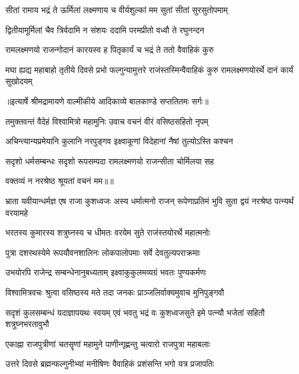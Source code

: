 \twolineshloka
{सीतां रामाय भद्रं ते ऊर्मिलां लक्ष्मणाय च}
{वीर्यशुल्कां मम सुतां सीतां सुरसुतोपमाम्} %

\twolineshloka
{द्वितीयामूर्मिलां चैव त्रिर्वदामि न संशयः}
{ददामि परमप्रीतो वध्वौ ते रघुनन्दन} %

\twolineshloka
{रामलक्ष्मणयो राजन्गोदानं कारयस्व ह}
{पितृकार्यं च भद्रं ते ततो वैवाहिकं कुरु} %

\threelineshloka
{मघा ह्यद्य महाबाहो तृतीये दिवसे प्रभो}
{फल्गुन्यामुत्तरे राजंस्तस्मिन्वैवाहिकं कुरु}
{रामलक्ष्मणयोरर्थे दानं कार्यं सुखोदयम्} %


{॥इत्यार्षे श्रीमद्रामायणे वाल्मीकीये आदिकाव्ये बालकाण्डे सप्ततितमः सर्गः॥}


\twolineshloka
{तमुक्तवन्तं वैदेहं विश्वामित्रो महामुनिः}
{उवाच वचनं वीरं वसिष्ठसहितो नृपम्} %

\twolineshloka
{अचिन्त्यान्यप्रमेयानि कुलानि नरपुङ्गव}
{इक्ष्वाकूणां विदेहानां नैषां तुल्योऽस्ति कश्चन} %

\twolineshloka
{सदृशो धर्मसम्बन्धः सदृशो रूपसम्पदा}
{रामलक्ष्मणयो राजन्सीता चोर्मिलया सह} %

{वक्तव्यं न नरश्रेष्ठ श्रूयतां वचनं मम॥॥} %

\addtocounter{shlokacount}{1}

\threelineshloka
{भ्राता यवीयान्धर्मज्ञ एष राजा कुशध्वजः}
{अस्य धर्मात्मनो राजन् रूपेणाप्रतिमं भुवि}
{सुता द्वयं नरश्रेष्ठ पत्न्यर्थं वरयामहे} %

\twolineshloka
{भरतस्य कुमारस्य शत्रुघ्नस्य च धीमतः}
{वरयेम सुते राजंस्तयोरर्थे महात्मनोः} %

\twolineshloka
{पुत्रा दशरथस्येमे रूपयौवनशालिनः}
{लोकपालोपमाः सर्वे देवतुल्यपराक्रमाः} %

\twolineshloka
{उभयोरपि राजेन्द्र सम्बन्धेनानुबध्यताम्}
{इक्ष्वाकुकुलमव्यग्रं भवतः पुण्यकर्मणः} %

\twolineshloka
{विश्वामित्रवचः श्रुत्वा वसिष्ठस्य मते तदा}
{जनकः प्राञ्जलिर्वाक्यमुवाच मुनिपुङ्गवौ} %

\threelineshloka
{सदृशं कुलसम्बन्धं यदाज्ञापयथः स्वयम्}
{एवं भवतु भद्रं वः कुशध्वजसुते इमे}
{पत्न्यौ भजेतां सहितौ शत्रुघ्नभरतावुभौ} %

\twolineshloka
{एकाह्ना राजपुत्रीणां चतसॄणां महामुने}
{पाणीन्गृह्णन्तु चत्वारो राजपुत्रा महाबलाः} %

\twolineshloka
{उत्तरे दिवसे ब्रह्मन्फल्गुनीभ्यां मनीषिणः}
{वैवाहिकं प्रशंसन्ति भगो यत्र प्रजापतिः} %

